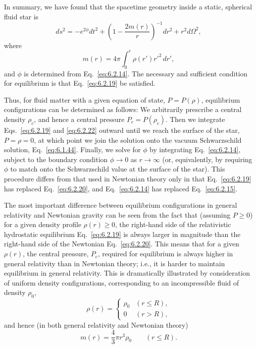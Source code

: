 In summary, we have found that the spacetime geometry inside a static, spherical
fluid star is
\begin{equation}
  ds^2=-e^{2\phi}dt^2+
  \left(1-\frac{2m(r)}{r}\right)^{-1}dr^2+r^2d\Omega^2,
  \tag{6.2.21}\label{eq:6.2.21}
\end{equation}
where
\begin{equation}
  m(r)=4\pi\int_0^r\rho(r')r'^2\,dr',
  \tag{6.2.22}\label{eq:6.2.22}
\end{equation}
and \(\phi\) is determined from Eq.~\eqref{eq:6.2.14}. The necessary and
sufficient condition for equilibrium is that Eq.~\eqref{eq:6.2.19} be
satisfied.

Thus, for fluid matter with a given equation of state, \(P=P(\rho)\), equilibrium
configurations can be determined as follows: We arbitrarily prescribe a central
density \(\rho_c\), and hence a central pressure \(P_c=P(\rho_c)\). Then we
integrate Eqs.~\eqref{eq:6.2.19} and \eqref{eq:6.2.22} outward until we reach the
surface of the star, \(P=\rho=0\), at which point we join the solution onto the
vacuum Schwarzschild solution, Eq.~\eqref{eq:6.1.44}. Finally, we solve for
\(\phi\) by integrating Eq.~\eqref{eq:6.2.14}, subject to the boundary condition
\(\phi\to0\) as \(r\to\infty\) (or, equivalently, by requiring \(\phi\) to match
onto the Schwarzschild value at the surface of the star). This procedure differs
from that used in Newtonian theory only in that Eq.~\eqref{eq:6.2.19} has replaced
Eq.~\eqref{eq:6.2.20}, and Eq.~\eqref{eq:6.2.14} has replaced
Eq.~\eqref{eq:6.2.15}.

The most important difference between equilibrium configurations in general
relativity and Newtonian gravity can be seen from the fact that (assuming
\(P\geq0\)) for a given density profile \(\rho(r)\geq0\), the right-hand side of
the relativistic hydrostatic equilibrium Eq.~\eqref{eq:6.2.19} is always larger
in magnitude than the right-hand side of the Newtonian Eq.~\eqref{eq:6.2.20}.
This means that for a given \(\rho(r)\), the central pressure, \(P_c\), required
for equilibrium is always higher in general relativity than in Newtonian theory;
i.e., it is harder to maintain equilibrium in general relativity. This is
dramatically illustrated by consideration of uniform density configurations,
corresponding to an incompressible fluid of density \(\rho_0\),
\begin{equation}
  \rho(r)=
  \begin{cases}
    \rho_0 & (r\leq R),\\
    0 & (r>R),
  \end{cases}
  \tag{6.2.23}\label{eq:6.2.23}
\end{equation}
and hence (in both general relativity and Newtonian theory)
\begin{equation}
  m(r)=\frac43\pi r^3\rho_0\qquad(r\leq R).
  \tag{6.2.24}\label{eq:6.2.24}
\end{equation}

